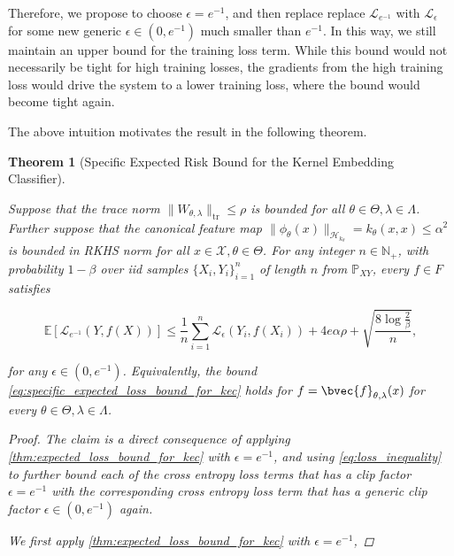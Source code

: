 \documentclass{article}
\newtheorem{theorem}{Theorem}[section]
\begin{document}
		Therefore, we propose to choose $\epsilon = e^{-1}$, and then replace replace $\mathcal{L}_{e^{-1}}$ with $\mathcal{L}_{\epsilon}$ for some new generic $\epsilon \in (0, e^{-1})$ much smaller than $e^{-1}$. In this way, we still maintain an upper bound for the training loss term. While this bound would not necessarily be tight for high training losses, the gradients from the high training loss would drive the system to a lower training loss, where the bound would become tight again.
		
		The above intuition motivates the result in the following theorem.
	
		\begin{theorem}[Specific Expected Risk Bound for the Kernel Embedding Classifier]
			\label{thm:specific_expected_loss_bound_for_kec}
			
			Suppose that the trace norm $\| W_{\theta, \lambda} \|_{\mathrm{tr}} \leq \rho$ is bounded for all $\theta \in \Theta, \lambda \in \Lambda$. Further suppose that the canonical feature map $\| \phi_{\theta}(x) \|_{\mathcal{H}_{k_{\theta}}} = k_{\theta}(x, x) \leq \alpha^{2}$ is bounded in RKHS norm for all $x \in \mathcal{X}, \theta \in \Theta$. For any integer $n \in \mathbb{N}_{+}$, with probability $1 - \beta$ over \textit{iid} samples $\{X_{i}, Y_{i}\}_{i = 1}^{n}$ of length $n$ from $\mathbb{P}_{X Y}$, every $f \in F$ satisfies
			
			\begin{equation}
			\mathbb{E}[\mathcal{L}_{e^{-1}}(Y, f(X))] \leq \frac{1}{n} \sum_{i = 1}^{n} \mathcal{L}_{\epsilon}(Y_{i}, f(X_{i})) + 4 e \alpha \rho + \sqrt{\frac{8 \log{\frac{2}{\beta}}}{n}},
			\label{eq:specific_expected_loss_bound_for_kec}
			\end{equation}
			
			for any $\epsilon \in (0, e^{-1})$. Equivalently, the bound \eqref{eq:specific_expected_loss_bound_for_kec} holds for $f = \bvec{f}_{\theta, \lambda}(x)$ for every $\theta \in \Theta, \lambda \in \Lambda$.
			
			\begin{proof}
				The claim is a direct consequence of applying \cref{thm:expected_loss_bound_for_kec} with $\epsilon = e^{-1}$, and using \eqref{eq:loss_inequality} to further bound each of the cross entropy loss terms that has a clip factor $\epsilon = e^{-1}$ with the corresponding cross entropy loss term that has a generic clip factor $\epsilon \in (0, e^{-1})$ again.
				
				We first apply \cref{thm:expected_loss_bound_for_kec} with $\epsilon = e^{-1}$,
				

\end{proof}
\end{theorem}
\end{document}
